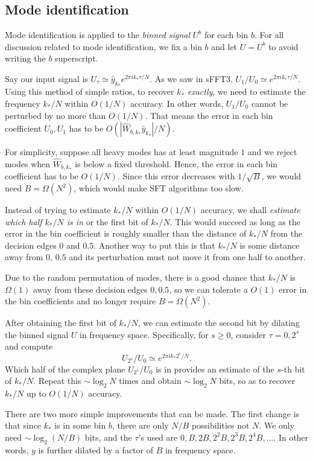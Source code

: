 \documentclass[10pt]{article}
\begin{document}
\subsection{Mode identification}

Mode identification is applied to the \emph{binned signal} $U^b$ for each bin $b$. For all discussion related to mode identification, we fix a bin $b$ and let $U=U^b$ to avoid writing the $b$ superscript.

Say our input signal is $U_{\tau} \simeq \hat{y}_{k_*} e^{2\pi i k_* \tau/N}$. As we saw in sFFT3, $U_1/U_0 \simeq e^{2\pi i k_* \tau/N}$. Using this method of simple ratios, to recover $k_*$ \emph{exactly}, we need to estimate the frequency $k_*/N$ within $O(1/N)$ accuracy. In other words, $U_1/U_0$ cannot be perturbed by no more than $O(1/N)$. That means the error in each bin coefficient $U_0,U_1$ has to be $O(|\hat{W}_{b,k_*}\hat{y}_{k_*}|/N)$.

For simplicity, suppose all heavy modes has at least magnitude $1$ and we reject modes when $\hat{W}_{b,k_*}$ is below a fixed threshold. Hence, the error in each bin coefficient has to be $O(1/N)$. Since this error decreases with $1/\sqrt{B}$, we would need $B=\Omega(N^2)$, which would make SFT algorithms too slow.

Instead of trying to estimate $k_*/N$ within $O(1/N)$ accuracy, we shall \emph{estimate which half $k_*/N$ is in} or the first bit of $k_*/N$. This would succeed as long as the error in the bin coefficient is roughly smaller than the distance of $k_*/N$ from the decision edges $0$ and $0.5$. Another way to put this is that $k_*/N$ is some distance away from $0$, $0.5$ and its perturbation must not move it from one half to another.

Due to the random permutation of modes, there is a good chance that $k_*/N$ is $\Omega(1)$ away from these decision edges $0,0.5$, so we can tolerate a $O(1)$ error in the bin coefficients and no longer require $B=\Omega(N^2)$.

After obtaining the first bit of $k_*/N$, we can estimate the second bit by dilating the binned signal $U$ in frequency space. Specifically, for $s\geq 0$, consider $\tau=0,2^s$ and compute
$$U_{2^s}/U_0 \simeq e^{2\pi i k_* 2^s/N}.$$
Which half of the complex plane $U_{2^s}/U_0$ is in provides an estimate of the $s$-th bit of $k_*/N$. Repeat this $\sim \log_2 N$ times and obtain $\sim \log_2 N$ bits, so as to recover $k_*/N$ up to $O(1/N)$ accuracy.

There are two more simple improvements that can be made. The first change is that since $k_*$ is in some bin $b$, there are only $N/B$ possibilities not $N$. We only need $\sim \log_2 (N/B)$ bits, and the $\tau$'s used are $0, B, 2B, 2^2 B, 2^3 B, 2^4 B, \ldots$. In other words, $y$ is further dilated by a factor of $B$ in frequency space.
\end{document}
